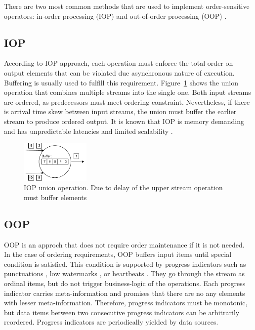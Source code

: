
\label {fs-typical}

There are two most common methods that are used to implement order-sensitive operators: in-order processing (IOP) \cite{Arasu:2006:CCQ:1146461.1146463, Cranor:2003:GSD:872757.872838, hammad2004optimizing} and out-of-order processing (OOP) \cite{Li:2008:OPN:1453856.1453890}.

\subsection{IOP}
According to IOP approach, each operation must enforce the total order on output elements that can be violated due asynchronous nature of execution. Buffering is usually used to fulfill this requirement. Figure~\ref{iop} shows the union operation that combines multiple streams into the single one. Both input streams are ordered, as predecessors must meet ordering constraint. Nevertheless, if there is arrival time skew between input streams, the union must buffer the earlier stream to produce ordered output. It is known that IOP is memory demanding and has unpredictable latencies and limited scalability \cite{Li:2008:OPN:1453856.1453890}.

\begin{figure}[htbp]
  \centering
  \includegraphics[width=0.30\textwidth]{pics/iop}
  \caption{IOP union operation. Due to delay of the upper stream operation must buffer elements}
  \label {iop}
\end{figure}

\subsection{OOP}

OOP is an approch that does not require order maintenance if it is not needed. In the case of ordering requirements, OOP buffers input items until special condition is satisfied. This condition is supported by progress indicators such as punctuations \cite{Tucker:2003:EPS:776752.776780}, low watermarks \cite{Akidau:2013:MFS:2536222.2536229}, or heartbeats \cite{Srivastava:2004:FTM:1055558.1055596}. They go through the stream as ordinal items, but do not trigger business-logic of the operations. Each progress indicator carries meta-information and promises that there are no any elements with lesser meta-information. Therefore, progress indicators must be monotonic, but data items between two consecutive progress indicators can be arbitrarily reordered. Progress indicators are periodically yielded by data sources.

